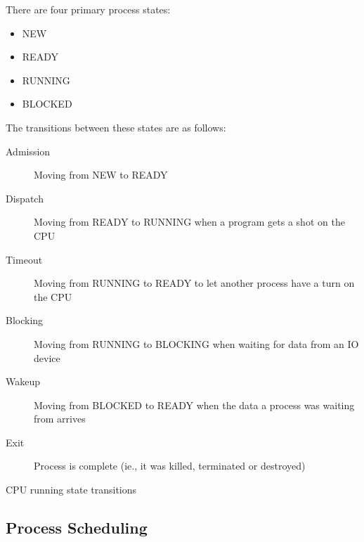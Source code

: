 There are four primary process states:
\begin{itemize}
    \item NEW
    \item READY
    \item RUNNING
    \item BLOCKED
\end{itemize}
The transitions between these states are as follows:
\begin{description}
    \item[Admission] Moving from NEW to READY
    \item[Dispatch] Moving from READY to RUNNING when a program gets a shot on the CPU
    \item[Timeout] Moving from RUNNING to READY to let another process have a turn on the CPU
    \item[Blocking] Moving from RUNNING to BLOCKING when waiting for data from an IO device
    \item[Wakeup] Moving from BLOCKED to READY when the data a process was waiting from arrives
    \item[Exit] Process is complete (ie., it was killed, terminated or destroyed)
\end{description}

\begin{highlight}{CPU running state transitions}
\end{highlight}

\subsection{Process Scheduling}\label{sub:process_scheduling}

